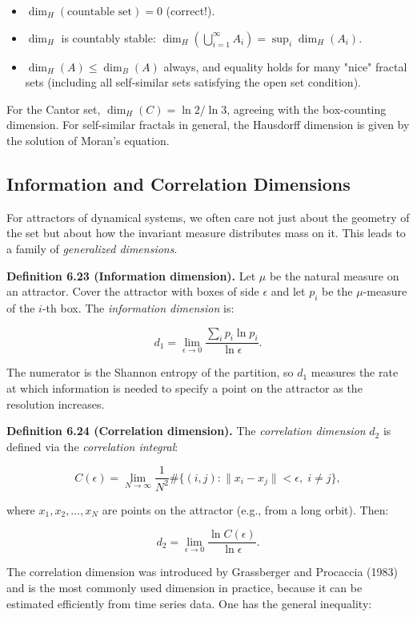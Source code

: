 \begin{itemize}[nosep]
  \item $\dim_H(\text{countable set}) = 0$ (correct!).
  \item $\dim_H$ is countably stable: $\dim_H(\bigcup_{i=1}^\infty A_i) = \sup_i \dim_H(A_i)$.
  \item $\dim_H(A) \leq \dim_B(A)$ always, and equality holds for many "nice" fractal sets (including all self-similar sets satisfying the open set condition).
\end{itemize}

For the Cantor set, $\dim_H(C) = \ln 2 / \ln 3$, agreeing with the box-counting dimension. For self-similar fractals in general, the Hausdorff dimension is given by the solution of Moran's equation.

\subsection{Information and Correlation Dimensions}\label{sec:6.5.3}

For attractors of dynamical systems, we often care not just about the geometry of the set but about how the invariant measure distributes mass on it. This leads to a family of \textit{generalized dimensions}.

\textbf{Definition 6.23 (Information dimension).} Let $\mu$ be the natural measure on an attractor. Cover the attractor with boxes of side $\epsilon$ and let $p_i$ be the $\mu$-measure of the $i$-th box. The \textit{information dimension} is:

\[
d_1 = \lim_{\epsilon \to 0} \frac{\sum_i p_i \ln p_i}{\ln \epsilon}.
\]

The numerator is the Shannon entropy of the partition, so $d_1$ measures the rate at which information is needed to specify a point on the attractor as the resolution increases.

\textbf{Definition 6.24 (Correlation dimension).} The \textit{correlation dimension} $d_2$ is defined via the \textit{correlation integral}:

\[
C(\epsilon) = \lim_{N \to \infty} \frac{1}{N^2} \#\{(i,j) : \|x_i - x_j\| < \epsilon, \; i \neq j\},
\]

where $x_1, x_2, \ldots, x_N$ are points on the attractor (e.g., from a long orbit). Then:

\[
d_2 = \lim_{\epsilon \to 0} \frac{\ln C(\epsilon)}{\ln \epsilon}.
\]

The correlation dimension was introduced by Grassberger and Procaccia (1983) and is the most commonly used dimension in practice, because it can be estimated efficiently from time series data. One has the general inequality:

